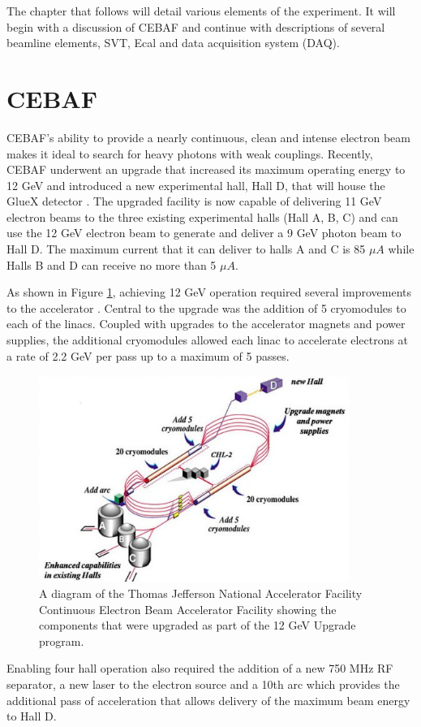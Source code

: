 The chapter that follows will detail various elements of the experiment.
It will begin with a discussion of CEBAF and continue with descriptions
of several beamline elements, SVT, Ecal and data acquisition system (DAQ).

\section{CEBAF}

CEBAF's ability to provide a nearly continuous, clean and intense electron
beam makes it ideal to search for heavy photons with weak couplings. Recently,
CEBAF underwent an upgrade that increased its maximum operating energy to 12
GeV and introduced a new experimental hall, Hall D, that will house the
GlueX detector \cite{Dudek:2012vr}.  The upgraded facility is now capable of 
delivering 11 GeV electron beams to the three existing experimental halls
(Hall A, B, C) and can use the 12 GeV electron beam to generate and deliver a 9
GeV photon beam to Hall D.  The maximum current that it can deliver to halls
A and C is 85 $\mu A$ while Halls B and D can receive no more than 5 $\mu A$.

As shown in Figure \ref{fig:cebaf}, achieving 12 GeV operation required several
improvements to the accelerator \cite{Burkert:2012rh}. Central to the upgrade 
was the addition of 5 
cryomodules to each of the linacs.  Coupled with upgrades to the accelerator
magnets and power supplies, the additional cryomodules allowed each linac to
accelerate electrons at a rate of 2.2 GeV per pass up to a maximum of 5 passes.
\begin{figure}[h]
    \centering
    \includegraphics[width=0.9\textwidth]{images/cebaf.jpg}
    \caption{A diagram of the Thomas Jefferson National Accelerator Facility
             Continuous Electron Beam Accelerator Facility showing the 
             components that were upgraded as part of the 12 GeV Upgrade 
             program.}
    \label{fig:cebaf}
\end{figure}
Enabling four hall operation also required the addition of a new 750 MHz RF 
separator, a new laser to the electron source and a 10th arc which provides
the additional pass of acceleration that allows 
delivery of the maximum beam energy to Hall D.



